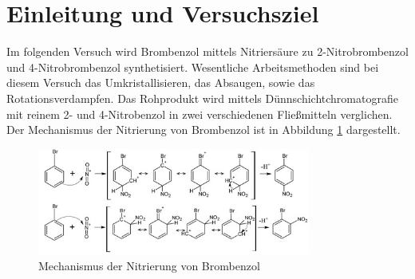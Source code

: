 \section{Einleitung und Versuchsziel}
\label{sec:aufgabenstellung}

Im folgenden Versuch wird Brombenzol mittels Nitriersäure zu 2-Nitrobrombenzol und 4-Nitrobrombenzol synthetisiert. Wesentliche Arbeitsmethoden sind bei diesem Versuch das Umkristallisieren, das Absaugen, sowie das Rotationsverdampfen. Das Rohprodukt wird mittels Dünnschichtchromatografie mit reinem 2- und 4-Nitrobenzol in zwei verschiedenen Fließmitteln verglichen.\\
Der Mechanismus der Nitrierung von Brombenzol ist in Abbildung \ref{fig:mechanismus} dargestellt.

\begin{figure}[h!]
	\centering
	\includegraphics[width=0.8\textwidth]{img/mechanismus}
	\caption{Mechanismus der Nitrierung von Brombenzol}
	\label{fig:mechanismus}
\end{figure}
\FloatBarrier



